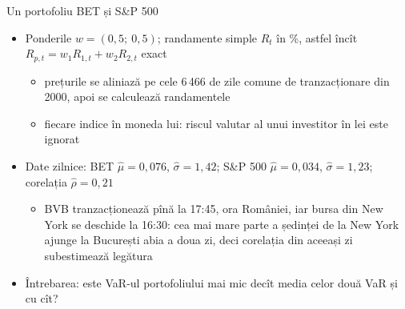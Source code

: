 \begin{frame}{Un portofoliu BET și S\&P 500}
\itemsize{\small}
\begin{itemize}
    \item Ponderile $w = (0{,}5;\ 0{,}5)$; randamente simple $R_t$ în \%, astfel încît $R_{p,t} = w_1R_{1,t} + w_2R_{2,t}$ exact
    \begin{itemize}
        \item prețurile se aliniază pe cele 6\,466 de zile comune de tranzacționare din 2000, apoi se calculează randamentele
        \item fiecare indice în moneda lui: riscul valutar al unui investitor în lei este ignorat
    \end{itemize}
    \item Date zilnice: BET $\hat\mu = 0{,}076$, $\hat\sigma = 1{,}42$; S\&P 500 $\hat\mu = 0{,}034$, $\hat\sigma = 1{,}23$; corelația $\hat\rho = 0{,}21$
    \begin{itemize}
        \item BVB tranzacționează pînă la 17:45, ora României, iar bursa din New York se deschide la 16:30: cea mai mare parte a ședinței de la New York ajunge la București abia a doua zi, deci corelația din aceeași zi subestimează legătura
    \end{itemize}
    \item Întrebarea: este VaR-ul portofoliului mai mic decît media celor două VaR și cu cît?
\end{itemize}
\end{frame}

